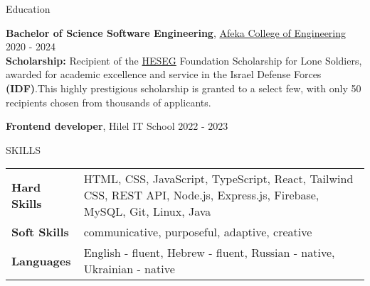 \documentclass{resume}
\begin{document}

    \begin{rSection}{Education}



    {\bf Bachelor of Science Software Engineering}, \href{https://www.afeka.ac.il/}{Afeka College of Engineering} \hfill {2020 - 2024}\\
    \textbf{Scholarship: }Recipient of the \href{https://www.heseg.com/}{HESEG} Foundation Scholarship for Lone Soldiers, awarded for academic excellence and service in the Israel Defense Forces \textbf{(IDF)}.This highly prestigious scholarship is granted to a select few, with only 50 recipients chosen from thousands of applicants.


        {\bf Frontend developer}, Hilel IT School \hfill {2022 - 2023}

    \end{rSection}

    \begin{rSection}{SKILLS}
        \begin{tabularx}{\textwidth}{@{}>{\bfseries}l X@{}}
            Hard Skills & HTML, CSS, JavaScript, TypeScript, React, Tailwind CSS, REST API, Node.js, Express.js, Firebase, MySQL, Git, Linux, Java \\
            Soft Skills & communicative, purposeful, adaptive, creative\\
            Languages & English - fluent, Hebrew - fluent, Russian - native, Ukrainian - native
        \end{tabularx}

    \end{rSection}

\end{document}
